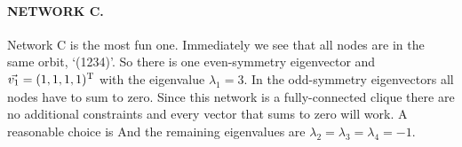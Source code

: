 \paragraph{NETWORK C.} Network C is the most fun one. Immediately we see that all nodes are in the same orbit, `(1234)'. So there is one even-symmetry eigenvector and $\vec{v_1}=(1,1,1,1)^{\rm T}$ with the eigenvalue $\lambda_1=3$. In the odd-symmetry eigenvectors all nodes have to sum to zero. Since this network is a fully-connected clique there are no additional constraints and every vector that sums to zero will work. A reasonable choice is
And the remaining eigenvalues are $\lambda_2=\lambda_3=\lambda_4=-1$.
 